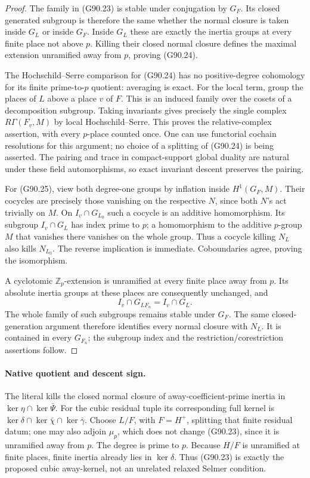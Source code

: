 \begin{proof}
The family in (G90.23) is stable under conjugation by \(G_F\).
Its closed generated subgroup is therefore the same whether the
normal closure is taken inside \(G_L\) or inside \(G_F\).
Inside \(G_L\) these are exactly the inertia groups at every finite
place not above \(p\).  Killing their closed normal closure defines
the maximal extension unramified away from \(p\), proving (G90.24).

The Hochschild--Serre comparison for (G90.24) has no positive-degree
cohomology for its finite prime-to-\(p\) quotient: averaging is exact.
For the local term, group the places of \(L\) above a place \(v\) of
\(F\).  This is an induced family over the cosets of a decomposition
subgroup.  Taking invariants gives precisely the single complex
\(R\Gamma(F_v,M)\) by local Hochschild--Serre.  This proves the
relative-complex assertion, with every \(p\)-place counted once.
One can use functorial cochain resolutions for this argument; no
choice of a splitting of (G90.24) is being asserted.
The pairing and trace in compact-support global duality are natural
under these field automorphisms, so exact invariant descent preserves
the pairing.

For (G90.25), view both degree-one groups by inflation inside
\(H^1(G_F,M)\).  Their cocycles are precisely those vanishing on the
respective \(N\), since both \(N\)'s act trivially on \(M\).
On \(I_v\cap G_{L_0}\) such a cocycle is an additive homomorphism.
Its subgroup \(I_v\cap G_L\) has index prime to \(p\); a homomorphism
to the additive \(p\)-group \(M\) that vanishes there vanishes on the
whole group.  Thus a cocycle killing \(N_L\) also kills \(N_{L_0}\).
The reverse implication is immediate.  Coboundaries agree, proving
the isomorphism.

A cyclotomic \(\mathbb Z_p\)-extension is unramified at every finite
place away from \(p\).  Its absolute inertia groups at these places
are consequently unchanged, and
\[
 I_v\cap G_{L F_n}=I_v\cap G_L .
 \tag{G90.26}
\]
The whole family of such subgroups remains stable under \(G_F\).
The same closed-generation argument therefore identifies every
normal closure with \(N_L\).  It is contained in every \(G_{F_n}\);
the subgroup index and the restriction/corestriction assertions
follow.
\end{proof}

\paragraph{Native quotient and descent sign.}
The literal  kills the closed normal
closure of away-coefficient-prime inertia in
\(\ker\eta\cap\ker\bar\Psi\).  For the cubic residual tuple its
corresponding full kernel is
\(\ker\delta\cap\ker\bar\chi\cap\ker\bar\gamma\).
Choose \(L/F\), with \(F=H^+\), splitting that finite residual datum;
one may also adjoin \(\mu_p\), which does not change (G90.23), since
it is unramified away from \(p\).
The degree is prime to \(p\).
Because \(H/F\) is unramified at finite places, finite inertia already
lies in \(\ker\delta\).  Thus (G90.23) is exactly the proposed cubic
away-kernel, not an unrelated relaxed Selmer condition.


